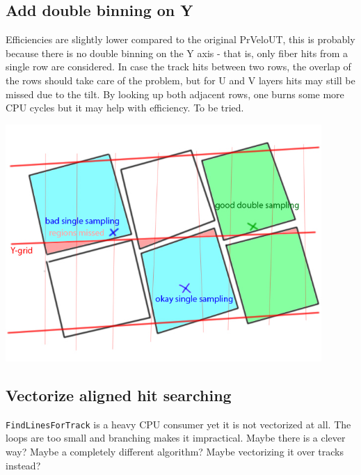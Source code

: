\documentclass[12pt]{article}
\newcommand{\code}[1]{\texttt{#1}}
\begin{document}
\newpage
\subsection{Add double binning on Y}

Efficiencies are slightly lower compared to the original PrVeloUT, this is probably because there is no double binning on the Y axis - that is, only fiber hits from a single row are considered. In case the track hits between two rows, the overlap of the rows should take care of the problem, but for U and V layers hits may still be missed due to the tilt. By looking up both adjacent rows, one burns some more CPU cycles but it may help with efficiency. To be tried.

\includegraphics[width=0.9\textwidth]{images/y_double_binning.jpg}

\subsection{Vectorize aligned hit searching}

\code{FindLinesForTrack} is a heavy CPU consumer yet it is not vectorized at all. The loops are too small and branching makes it impractical. Maybe there is a clever way? Maybe a completely different algorithm? Maybe vectorizing it over tracks instead?
\end{document}

